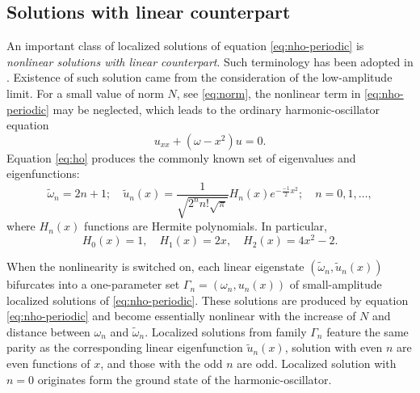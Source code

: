 \subsection{Solutions with linear counterpart}

An important class of localized solutions of equation \eqref{eq:nho-periodic} is {\it nonlinear solutions with linear counterpart}.
Such terminology has been adopted in \cite{AgostaMalomedPresilla, AgostaPresilla}.
Existence of such solution came from the consideration of the low-amplitude limit.
For a small value of norm $N$, see \eqref{eq:norm}, the nonlinear term in \eqref{eq:nho-periodic} may be neglected, which leads to the ordinary harmonic-oscillator equation
\begin{equation}
	u_{xx} + (\omega - x^2) u = 0.
\label{eq:ho}
\end{equation}
Equation \eqref{eq:ho} produces the commonly known set of eigenvalues and eigenfunctions:
\begin{equation}
	\tilde{\omega}_n = 2n + 1; \quad \tilde{u}_n(x) = \dfrac{1}{\sqrt{2^n n! \sqrt{\pi}}} H_n(x) e^{-\frac{-1}{2} x^2}; \quad n = 0, 1, \dots,
\label{eq:ho-solutions}
\end{equation}
where $H_n(x)$ functions are Hermite polynomials.
In particular,
\begin{equation*}
	H_0(x) = 1, \quad H_1(x) = 2x, \quad H_2(x) = 4x^2 - 2.	
\end{equation*}

When the nonlinearity is switched on, each linear eigenstate $(\tilde{\omega}_n, \tilde{u}_n(x))$ bifurcates into a one-parameter set $\Gamma_n = (\omega_n, u_n(x))$ of small-amplitude localized solutions of \eqref{eq:nho-periodic}.
These solutions are produced by equation \eqref{eq:nho-periodic} and become essentially nonlinear with the increase of $N$ and distance between $\omega_n$ and $\tilde{\omega}_n$.
Localized solutions from family $\Gamma_n$ feature the same parity as the corresponding linear eigenfunction $\tilde{u}_n(x)$, solution with even $n$ are even functions of $x$, and those with the odd $n$ are odd.
Localized solution with $n = 0$ originates form the ground state of the harmonic-oscillator.


